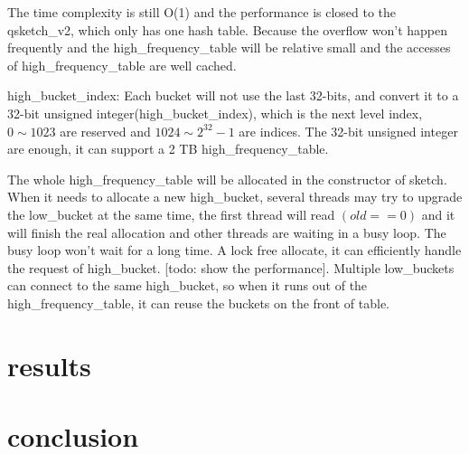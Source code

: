 \documentclass[conference]{IEEEtran}
\begin{document}

The time complexity is still O(1) and the performance is closed to the qsketch\_v2, which only has one hash table. Because the overflow won’t happen frequently and the high\_frequency\_table will be relative small and the accesses of high\_frequency\_table are well cached.

high\_bucket\_index:
Each bucket will not use the last 32-bits, and convert it to a 32-bit unsigned integer(high\_bucket\_index), which is the next level index, $0 \sim 1023$ are reserved and 
$1024 \sim 2 ^ {32} - 1$
are indices. 
The 32-bit unsigned integer are enough, it can support a 2 TB high\_frequency\_table.



The whole high\_frequency\_table will be allocated in the constructor of sketch. When it needs to allocate a new high\_bucket, several threads may try to upgrade the low\_bucket at the same time, the first thread will read $(old == 0)$ and it will finish the real allocation and other threads are waiting in a busy loop. The busy loop won't wait for a long time.
A lock free allocate, it can efficiently handle the request of high\_bucket. [todo: show the performance].
Multiple low\_buckets can connect to the same high\_bucket, so when it runs out of the high\_frequency\_table, it can reuse the buckets on the front of table.
\section{results}
\section{conclusion}
\end{document}
